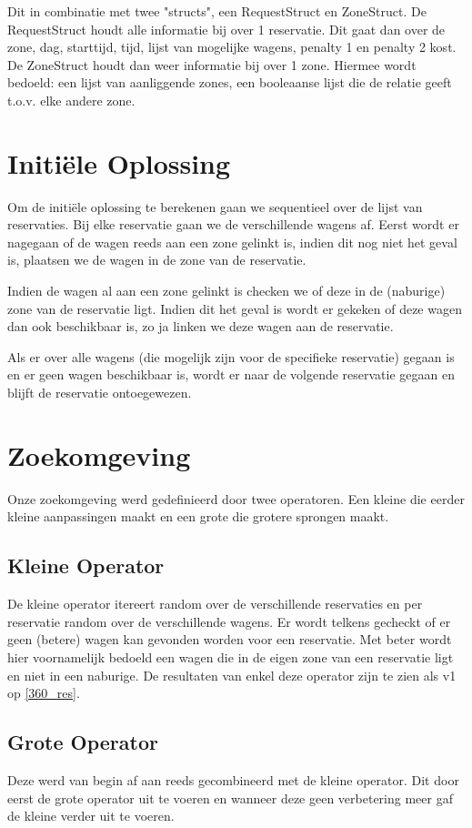 \documentclass[a4paper, 11pt, one column]{article}
\begin{document}
Dit in combinatie met twee "structs", een RequestStruct en ZoneStruct. De RequestStruct houdt alle informatie bij over 1 reservatie. Dit gaat dan over de zone, dag, starttijd, tijd, lijst van mogelijke wagens, penalty 1 en penalty 2 kost. De ZoneStruct houdt dan weer informatie bij over 1 zone. Hiermee wordt bedoeld: een lijst van aanliggende zones, een booleaanse lijst die de relatie geeft t.o.v. elke andere zone.


\section{Initiële Oplossing}
Om de initiële oplossing te berekenen gaan we sequentieel over de lijst van reservaties. Bij elke reservatie gaan we de verschillende wagens af. Eerst wordt er nagegaan of de wagen reeds aan een zone gelinkt is, indien dit nog niet het geval is, plaatsen we de wagen in de zone van de reservatie. 

Indien de wagen al aan een zone gelinkt is checken we of deze in de (naburige) zone van de reservatie ligt. Indien dit het geval is wordt er gekeken of deze wagen dan ook beschikbaar is, zo ja linken we deze wagen aan de reservatie.

Als er over alle wagens (die mogelijk zijn voor de specifieke reservatie) gegaan is en er geen wagen beschikbaar is, wordt er naar de volgende reservatie gegaan en blijft de reservatie ontoegewezen.

\section{Zoekomgeving}
Onze zoekomgeving werd gedefinieerd door twee operatoren. Een kleine die eerder kleine aanpassingen maakt en een grote die grotere sprongen maakt.

\subsection{Kleine Operator}
De kleine operator itereert random over de verschillende reservaties en per reservatie random over de verschillende wagens. Er wordt telkens gecheckt of er geen (betere) wagen kan gevonden worden voor een reservatie. Met beter wordt hier voornamelijk bedoeld een wagen die in de eigen zone van een reservatie ligt en niet in een naburige. De resultaten van enkel deze operator zijn te zien als v1 op \ref{360_res}.

\subsection{Grote Operator}
Deze werd van begin af aan reeds gecombineerd met de kleine operator. Dit door eerst de grote operator uit te voeren en wanneer deze geen verbetering meer gaf de kleine verder uit te voeren.
\end{document}
